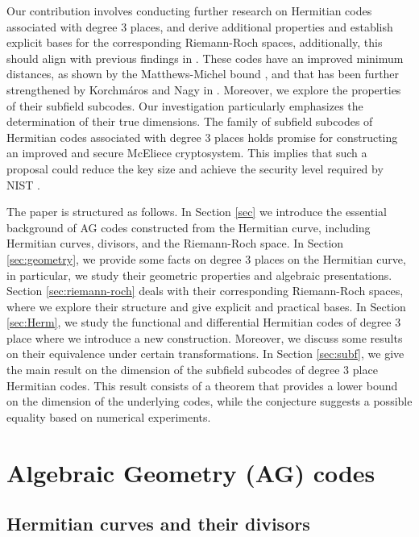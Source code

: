 \documentclass[entropy,article,submit,pdftex,moreauthors]{Definitions/mdpi}
\begin{document}
Our contribution involves conducting further research on Hermitian codes associated with degree $3$ places, and derive additional properties and establish explicit bases for the corresponding Riemann-Roch spaces, additionally, this should align with previous findings in \cite{korchmaros2013hermitian}. These codes have an improved minimum distances, as shown by the Matthews-Michel bound \cite{matthews2005one}, and that has been further strengthened  by Korchm\'aros and Nagy in \cite{korchmaros2013hermitian}. Moreover, we explore the properties of their subfield subcodes. Our investigation particularly emphasizes the determination of their true dimensions. The family of subfield subcodes of Hermitian codes associated with degree $3$ places holds promise for constructing an improved and secure McEliece cryptosystem. This implies that such a proposal could reduce the key size and achieve the security level required by NIST \cite{Nist}.


The paper is structured as follows. In Section \ref{sec} we introduce the essential background of AG codes constructed from the Hermitian curve, including Hermitian curves, divisors, and the Riemann-Roch space. In Section \ref{sec:geometry}, we provide some facts on degree 3 places on the Hermitian curve, in particular, we study their geometric properties and algebraic presentations. Section \ref{sec:riemann-roch} deals with their corresponding Riemann-Roch spaces, where we explore their structure and give explicit and practical bases. In Section \ref{sec:Herm}, we study the functional and differential Hermitian codes of degree 3 place where we introduce a new construction. Moreover, we discuss some results on their equivalence under certain transformations. In Section \ref{sec:subf}, we give the main result on the dimension of the subfield subcodes of degree 3 place Hermitian codes. This result consists of a theorem that provides a lower bound on the dimension of the underlying codes, while the conjecture suggests a possible equality based on numerical experiments. 


\section{Algebraic Geometry (AG) codes \label{sec}}

\subsection{Hermitian curves and their divisors}
\end{document}
